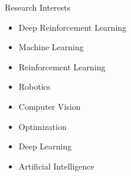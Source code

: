 \documentclass[]{mcdowellcv}
\begin{document}
    
    \begin{cvsection}{Research Interests}
        \begin{cvsubsection}{}{}{}
            \begin{multicols}{2}
                \begin{itemize}
                    \item Deep Reinforcement Learning
                    \item Machine Learning
                    \item Reinforcement Learning
                    \item Robotics
                    \item Computer Vision
                    \item Optimization
                    \item Deep Learning
                    \item Artificial Intelligence
                    
                    
                \end{itemize}
            \end{multicols}
        \end{cvsubsection}
    \end{cvsection}
    
\end{document}
